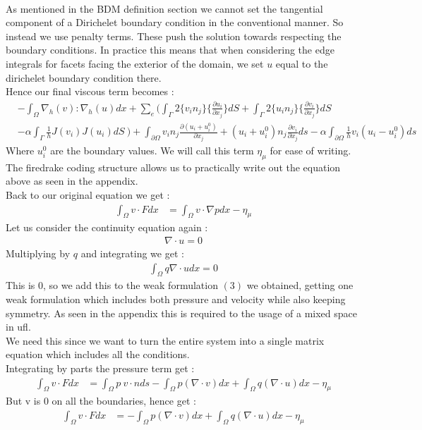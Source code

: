 \documentclass[11pt,twoside,a4paper]{article}
\begin{document}
\\
As mentioned in the BDM definition section we cannot set the tangential component of a Dirichelet boundary condition in the conventional manner.  So instead we use penalty terms. These push the solution towards respecting the boundary conditions. In practice this means that when considering the edge integrals for facets facing the exterior of the domain, we set $u$ equal to the dirichelet boundary condition there.\\
 Hence our final viscous term becomes :\\
\begin{align*}
&-  \int_\Omega \nabla_h(v) : \nabla_h(u) dx + \sum_e ( \int_\Gamma 2 \{ v_i n_j \} \{ \frac{\partial u_i}{\partial x_j}\} dS + \int_\Gamma 2 \{ u_i n_j \} \{ \frac{\partial v_i}{\partial x_j}\} dS \\
&- \alpha \int_\Gamma \frac{1}{h}  J(v_i) J(u_i) dS \ ) + \int_{\partial  \Omega} v_i n_j \frac{\partial(u_i + u^0_i)}{\partial x_j} + (u_i + u^0_i) n_j\frac{\partial v_i}{\partial x_j} ds - \alpha \int_{\partial \Omega} \frac{1}{h} v_i(u_i-u^0_i)ds
\end{align*}
Where $u^0_i$ are the boundary values.
We will call this term $\eta_\mu$ for ease of writing. The firedrake coding structure allows us to practically write out the equation above as seen in the appendix.\\
Back to our original equation we get :
\begin{align}
\int_\Omega v \cdot F dx &= \int_\Omega v \cdot \nabla p dx - \eta_\mu
\end{align}
Let us consider the continuity equation again :
\begin{align*}
\nabla \cdot u = 0
\end{align*}
Multiplying by $q$ and integrating we get :
\begin{align*}
\int_\Omega q \nabla \cdot u dx = 0
\end{align*}
This is $0$, so we add this to the weak formulation $(3)$ we obtained, getting one weak formulation which includes both pressure and velocity while also keeping symmetry. As seen in the appendix this is required to the usage of a mixed space in ufl.\\
We need this since we want to turn the entire system into a single matrix equation which includes all the conditions.\\
Integrating by parts the pressure term get :
\begin{align}
\int_\Omega v \cdot F dx &= \int_\Omega p \ v \cdot n ds - \int_\Omega  p ( \nabla \cdot v) dx + \int_\Omega q (\nabla \cdot u) dx  - \eta_\mu
\end{align}
But v is $0$ on all the boundaries, hence get :
\begin{align}
\int_\Omega v \cdot F dx &= - \int_\Omega  p ( \nabla \cdot v) dx + \int_\Omega q (\nabla \cdot u) dx  - \eta_\mu
\end{align}
\end{document}
